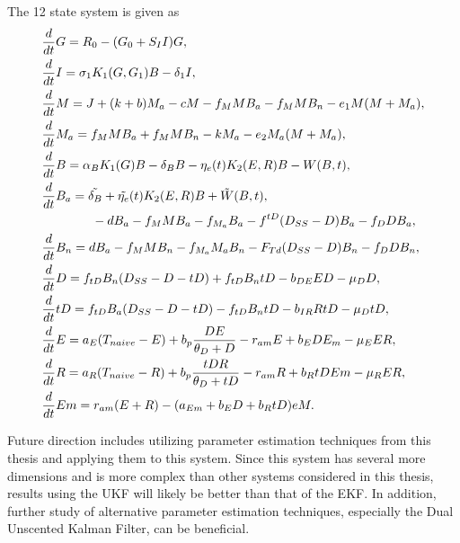 The 12 state system is given as 
\begin{align*}
    &\frac{d}{dt} G = R_0 - (G_0 + S_I I)G, \\ 
    &\frac{d}{dt}  I = \sigma_1 K_1 (G, G_1) B - \delta_1 I, \\
    &\frac{d}{dt} M = J +(k+b)M_a -cM - f_M MB_a - f_M MB_n - e_1M(M+M_a), \\
    & \frac{d}{dt} M_a = f_M MB_a +f_M MB_n - kM_a - e_2M_a(M + M_a),\\
    &\frac{d}{dt} B = \alpha_B K_1(G)B - \delta_B B - \eta_e(t)K_2(E,R)B - W(B, t),\\
    & \frac{d}{dt} B_a = \Tilde{\delta_B} + \Tilde{\eta_e} (t)K_2(E,R)B + \Tilde{W}(B, t), \\
    & \quad \quad  \quad \quad - dB_a - f_M MB_a - f_{M_a} B_a - f^{tD}(D_{SS} - D)B_a - f_D DB_a, \\
    &\frac{d}{dt} B_n = dB_a - f_M MB_n - f_{M_a} M_a B_n - F_{Td}(D_{SS} - D)B_n - f_D DB_n, \\
    & \frac{d}{dt} D = f_{tD}B_n(D_{SS} - D - tD) + f_{tD}B_n tD - b_{DE} ED - \mu_D D, \\
    & \frac{d}{dt} tD = f_{tD}B_a(D_{SS} - D - tD) - f_{tD}B_n tD - b_{IR}RtD - \mu_D tD, \\
    & \frac{d}{dt} E = a_E (T_{naive} - E) + b_p \frac{DE}{\theta_D + D} - r_{am}E + b_EDE_m - \mu_E ER, \\
    & \frac{d}{dt} R = a_R (T_{naive} - R) + b_p \frac{tDR}{\theta_D + tD} - r_{am}R + b_R tDEm - \mu_R ER, \\
    & \frac{d}{dt} Em = r_{am}(E + R) - (a_{Em} + b_E D + b_R tD)eM.
\end{align*}

\noindent Future direction includes utilizing parameter estimation techniques from this thesis and applying them to this system. Since this system has several more dimensions and is more complex than other systems considered in this thesis, results using the UKF will likely be better than that of the EKF. In addition, further study of alternative parameter estimation techniques, especially the Dual Unscented Kalman Filter, can be beneficial. 

